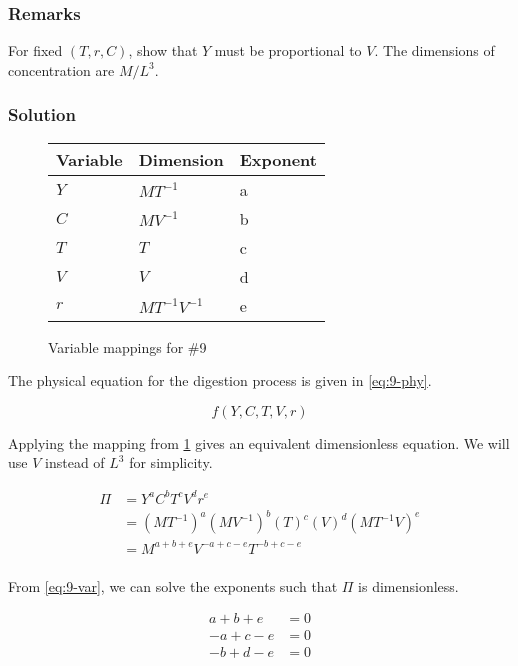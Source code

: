\documentclass[12pt]{article}
\begin{document}
  \subsubsection*{Remarks}
  For fixed $(T,r,C)$, show that $Y$ must be proportional to
  $V$. The dimensions of concentration are $M/L^3$.

  \subsubsection*{Solution}
  \begin{figure}
    \centering
    \begin{tabularx}{0.5\textwidth}{XXX}
      Variable & Dimension & Exponent \\ \hline
      $Y$ & $MT^{-1}$ & a \\
      $C$ & $MV^{-1}$ & b \\
      $T$ & $T$ & c \\
      $V$ & $V$ & d \\
      $r$ & $MT^{-1}V^{-1}$ & e \\
    \end{tabularx}
    \caption{Variable mappings for \#9}
    \label{fig:9-var-mappings}
  \end{figure}

  The physical equation for the digestion process is given in \cref{eq:9-phy}.

  \begin{equation}
    \label{eq:9-phy}
    f(Y,C,T,V,r)
  \end{equation}

  Applying the mapping from \cref{fig:9-var-mappings} gives an equivalent
  dimensionless equation. We will use $V$ instead of $L^3$ for simplicity.

  \begin{equation}
    \label{eq:9-var}
    \begin{aligned}
      \Pi &= Y^a C^b T^c V^d r^e \\
      &= (MT^{-1})^a (MV^{-1})^b (T)^c (V)^d (MT^{-1}V)^e \\
      &= M^{a+b+e}V^{-a+c-e}T^{-b+c-e} \\
    \end{aligned}
  \end{equation}

  From \cref{eq:9-var}, we can solve the exponents such that $\Pi$ is
  dimensionless.

  \begin{equation}
    \label{eq:9-exp-eqs}
    \begin{aligned}
      a + b + e &= 0 \\
      -a + c - e &= 0 \\
      -b + d - e &= 0 \\
    \end{aligned}
  \end{equation}
\end{document}
